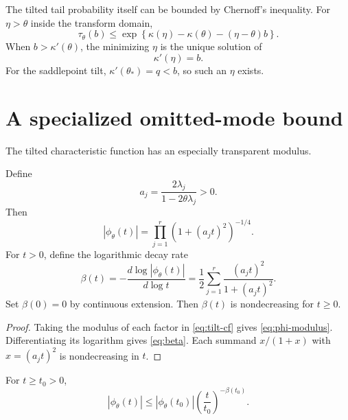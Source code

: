 The tilted tail probability itself can be bounded by Chernoff's inequality. For $\eta>\theta$ inside the transform domain,
\begin{equation}
\tau_{\theta}(b)
\le
\exp\left\{
\kappa(\eta)-\kappa(\theta)-(\eta-\theta)b
\right\}.
\label{eq:tilted-chernoff}
\end{equation}
When $b>\kappa'(\theta)$, the minimizing $\eta$ is the unique solution of
\begin{equation}
\kappa'(\eta)=b.
\label{eq:eta}
\end{equation}
For the saddlepoint tilt, $\kappa'(\theta_*)=q<b$, so such an $\eta$ exists.

\section{A specialized omitted-mode bound}

The tilted characteristic function has an especially transparent modulus.

\begin{lemma}
\label{lem:modulus}
Define
\begin{equation}
a_j=\frac{2\lambda_j}{1-2\theta\lambda_j}>0.
\label{eq:aj}
\end{equation}
Then
\begin{equation}
|\phi_{\theta}(t)|
=\prod_{j=1}^{r}\left(1+(a_jt)^2\right)^{-1/4}.
\label{eq:phi-modulus}
\end{equation}
For $t>0$, define the logarithmic decay rate
\begin{equation}
\beta(t)
=-\frac{d\log|\phi_{\theta}(t)|}{d\log t}
=\frac12\sum_{j=1}^{r}
\frac{(a_jt)^2}{1+(a_jt)^2}.
\label{eq:beta}
\end{equation}
Set $\beta(0)=0$ by continuous extension. Then $\beta(t)$ is nondecreasing for $t\ge0$.
\end{lemma}

\begin{proof}
Taking the modulus of each factor in \eqref{eq:tilt-cf} gives \eqref{eq:phi-modulus}. Differentiating its logarithm gives \eqref{eq:beta}. Each summand $x/(1+x)$ with $x=(a_jt)^2$ is nondecreasing in $t$.
\end{proof}

\begin{corollary}
\label{cor:power-envelope}
For $t\ge t_0>0$,
\begin{equation}
|\phi_{\theta}(t)|
\le
|\phi_{\theta}(t_0)|
\left(\frac{t}{t_0}\right)^{-\beta(t_0)}.
\label{eq:power-envelope}
\end{equation}
\end{corollary}

